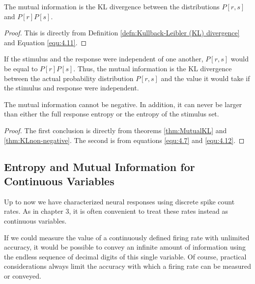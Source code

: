 \begin{thm}
  \label{thm:MutualKL}
  The mutual information is the KL divergence between the distributions $P[r,s]$ and $P[r]P[s]$.
\end{thm}
\begin{proof}
  This is directly from Definition \ref{defn:Kullback-Leibler (KL) divergence} and Equation \ref{equ:4.11}.
\end{proof}

\begin{rem}
  If the stimulus and the response were independent of one another, $P[r,s]$ would be equal to  $P[r]P[s]$. Thus, the mutual information is the KL divergence between the actual probability distribution $P[r,s]$ and the value it would take if the stimulus and response were independent.
\end{rem}

\begin{coro}
  The mutual information cannot be negative. In addition, it can never be larger than either the full response entropy or the entropy of the stimulus set.
\end{coro}
\begin{proof}
  The first conclusion is directly from theorems \ref{thm:MutualKL} and \ref{thm:KLnon-negative}. The second is from equations \ref{equ:4.7} and \ref{equ:4.12}.
\end{proof}

\subsection{Entropy and Mutual Information for Continuous Variables}

\begin{rem}
  Up to now we have characterized neural responses using discrete spike count rates. As in chapter 3, it is often convenient to treat these rates instead as continuous variables. %
\end{rem}

\begin{fac}
  If we could measure the value of a continuously defined firing rate with unlimited accuracy, it would be possible to convey an infinite amount of information using the endless sequence of decimal digits of this single variable. Of course, practical considerations always limit the accuracy with which a firing rate can be measured or conveyed.
\end{fac}

